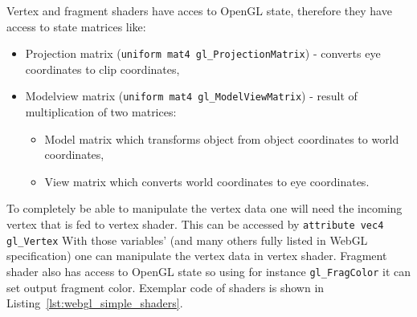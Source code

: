 \clearpage

Vertex and fragment shaders have acces to OpenGL state, therefore they have access to state matrices like:
\begin{itemize}
\item Projection matrix (\texttt{uniform mat4 gl\_ProjectionMatrix}) - converts eye coordinates to clip coordinates,
\item Modelview matrix (\texttt{uniform mat4 gl\_ModelViewMatrix}) - result of multiplication of two matrices: 
\begin{itemize}
\item Model matrix which transforms object from object coordinates to world coordinates,
\item View matrix which converts world coordinates to eye coordinates. 
\end{itemize}
\end{itemize}

To completely be able to manipulate the vertex data one will need the incoming vertex that is fed to vertex shader.
This can be accessed by \texttt{attribute vec4 gl\_Vertex}
With those variables' (and many others fully listed in WebGL specification) one can manipulate the vertex data in vertex shader.
Fragment shader also has access to OpenGL state so using for instance \texttt{gl\_FragColor} it can set output fragment color.
Exemplar code of shaders is shown in Listing~\ref{lst:webgl_simple_shaders}. 

\begin{filecode}[label=lst:webgl_simple_shaders,language=HTML,caption=Exemplar implementation of vertex and fragment shaders written in GLSL ES.]

\end{filecode}